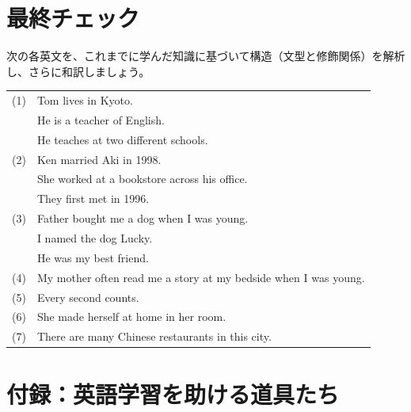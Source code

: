 \documentclass[titlepage]{jsarticle}
\begin{document}
  \section{最終チェック}
  次の各英文を、これまでに学んだ知識に基づいて構造（文型と修飾関係）を解析し、さらに和訳しましょう。
 \begin{table}[htbp]
    \begin{tabular}{ll}
     (1) & Tom lives in Kyoto. \\
     & He is a teacher of English. \\
     & He teaches at two different schools.\\
     (2) & Ken married Aki in 1998.\\
     & She worked at a bookstore across his office.\\
     & They first met in 1996.\\
     (3) & Father bought me a dog when I was young.\\
     & I named the dog Lucky.\\
     & He was my best friend.\\
     (4) & My mother often read me a story at my bedside when I was young.\\
     (5) & Every second counts.\\
     (6) & She made herself at home in her room.\\
     (7) & There are many Chinese restaurants in this city.\\
    \end{tabular}
 \end{table}


 \section{付録：英語学習を助ける道具たち}
\end{document}
